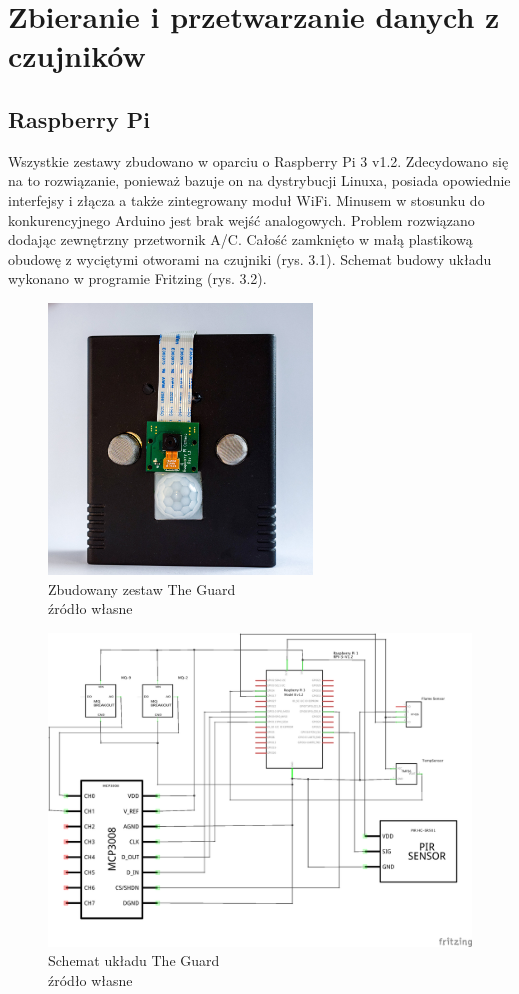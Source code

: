 \chapter{Zbieranie i przetwarzanie danych z czujników}
\section{Raspberry Pi}
Wszystkie zestawy zbudowano w oparciu o Raspberry Pi 3 v1.2. Zdecydowano się na to rozwiązanie, ponieważ bazuje on na dystrybucji Linuxa, posiada opowiednie interfejsy i złącza a także zintegrowany moduł WiFi. Minusem w stosunku do konkurencyjnego Arduino jest brak wejść analogowych. Problem rozwiązano dodając zewnętrzny przetwornik A/C. Całość zamknięto w małą plastikową obudowę z wyciętymi otworami na czujniki (rys. 3.1). Schemat budowy układu wykonano w programie Fritzing (rys. 3.2).
\begin{figure}[h]
	\centering
	\includegraphics[width=7cm]{guard.jpg}
	\caption{Zbudowany zestaw The Guard \\ źródło własne}
\end{figure}
\begin{figure}[h]
	\centering
	\includegraphics[width=15cm]{GuardSchem}
	\caption{Schemat układu The Guard \\ źródło własne}
\end{figure}
